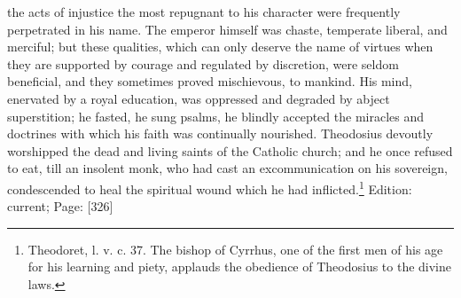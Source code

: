 the acts of injustice the most repugnant to his character were frequently perpetrated in his name. The emperor himself was chaste, temperate liberal, and merciful; but these qualities, which can only deserve the name of virtues when they are supported by courage and regulated by discretion, were seldom beneficial, and they sometimes proved mischievous, to mankind. His mind, enervated by a royal education, was oppressed and degraded by abject superstition; he fasted, he sung psalms, he blindly accepted the miracles and doctrines with which his faith was continually nourished. Theodosius devoutly worshipped the dead and living saints of the Catholic church; and he once refused to eat, till an insolent monk, who had cast an excommunication on his sovereign, condescended to heal the spiritual wound which he had inflicted.\footnote{Theodoret, l. v. c. 37. The bishop of Cyrrhus, one of the first men of his age for his learning and piety, applauds the obedience of Theodosius to the divine laws.}
Edition: current; Page: [326]

